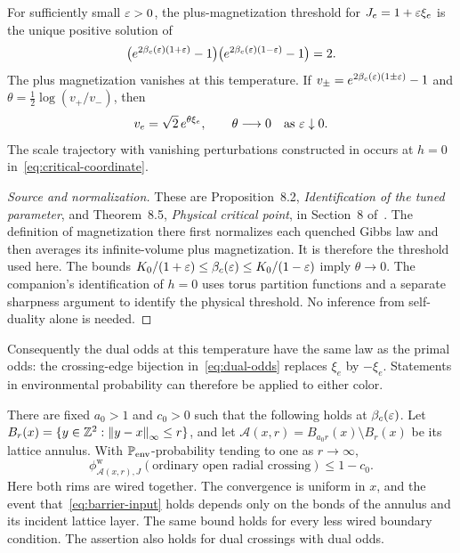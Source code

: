 \begin{proposition}\label{prop:critical-input}
For sufficiently small $\eps>0$, the plus-magnetization threshold for
$J_e=1+\eps\xi_e$ is the unique positive solution of
\begin{equation}
 \bigl(e^{2\beta_c(\eps)(1+\eps)}-1\bigr)
 \bigl(e^{2\beta_c(\eps)(1-\eps)}-1\bigr)=2.
 \label{eq:critical-self-duality}
\end{equation}
The plus magnetization vanishes at this temperature.  If
$v_\pm=e^{2\beta_c(\eps)(1\pm\eps)}-1$ and
$\theta=\frac12\log(v_+/v_-)$, then
\[
 v_e=\sqrt2\,e^{\theta\xi_e},\qquad \theta\longrightarrow0
 \quad\text{as }\eps\downarrow0.
\]
The scale trajectory with vanishing perturbations constructed in
\cite{Q} occurs at $h=0$ in~\eqref{eq:critical-coordinate}.
\end{proposition}

\begin{proof}[Source and normalization]
These are Proposition~8.2, \emph{Identification of the tuned parameter},
and Theorem~8.5, \emph{Physical critical point}, in Section~8 of~\cite{Q}.
The definition of magnetization there first normalizes each quenched
Gibbs law and then averages its infinite-volume plus magnetization.
It is therefore the threshold used here.  The bounds
$K_0/(1+\eps)\le\beta_c(\eps)\le K_0/(1-\eps)$ imply
$\theta\to0$.  The companion's identification of $h=0$ uses torus
partition functions and a separate sharpness argument to identify the
physical threshold.  No inference from self-duality alone is needed.
\end{proof}

Consequently the dual odds at this temperature have the same law as
the primal odds: the crossing-edge bijection in~\eqref{eq:dual-odds}
replaces $\xi_e$ by $-\xi_e$.  Statements in environmental probability
can therefore be applied to either color.

\begin{lemma}\label{lem:barrier-input}
There are fixed $a_0>1$ and $c_0>0$ such that the following holds at
$\beta_c(\eps)$.  Let
$B_r(x)=\{y\in\mathbb Z^2:\norm{y-x}_\infty\le r\}$, and let
$\mathcal A(x,r)=B_{a_0r}(x)\setminus B_r(x)$ be its lattice annulus.
With $\P_{\mathrm{env}}$-probability tending to one as $r\to\infty$,
\begin{equation}
 \phi_{\mathcal A(x,r),J}^{\mathrm w}
 (\text{ordinary open radial crossing})\le1-c_0.
 \label{eq:barrier-input}
\end{equation}
Here both rims are wired together.  The convergence is uniform in $x$,
and the event that~\eqref{eq:barrier-input} holds depends only on the
bonds of the annulus and its incident lattice layer.  The same bound
holds for every less wired boundary condition.  The assertion also
holds for dual crossings with dual odds.
\end{lemma}

